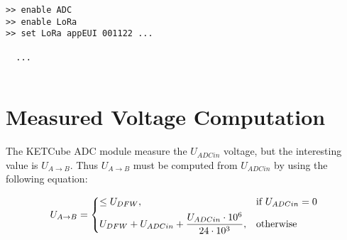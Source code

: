 \begin{docCodeExample}
\begin{verbatim}
>> enable ADC
>> enable LoRa 
>> set LoRa appEUI 001122 ...

  ...
  
\end{verbatim}
\end{docCodeExample}


\section{Measured Voltage Computation}
  The KETCube ADC module measure the $U_{ADCin}$ voltage, but the interesting value is $U_{A \rightarrow B}$. Thus $U_{A \rightarrow B}$ must be computed from  $U_{ADCin}$ by using the following equation:
  
\[
   U_{A \rightarrow B} = 
   \begin{dcases}
     \leq U_{DFW}, & \text{if } U_{ADCin} = 0\\
     U_{DFW} + U_{ADCin} + \frac{U_{ADCin} \cdot 10^6}{24 \cdot 10^3}, & \text{otherwise}
   \end{dcases}
\]



  

\clearpage





